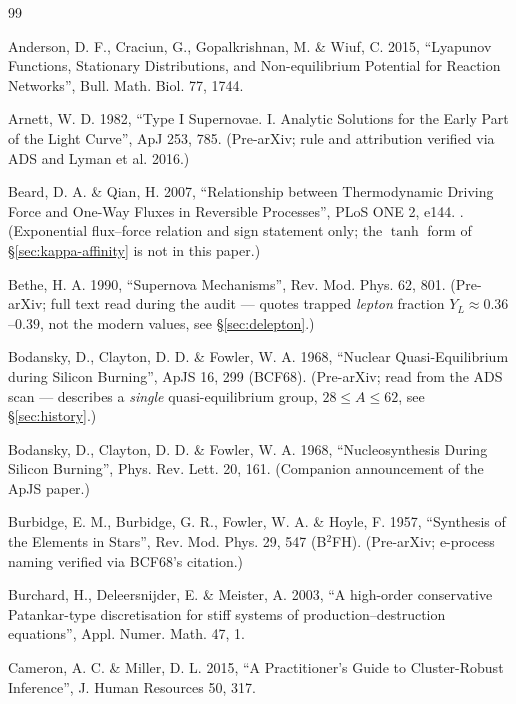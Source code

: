 \begingroup
\raggedright
\begin{thebibliography}{99}

Anderson, D. F., Craciun, G., Gopalkrishnan, M. \& Wiuf, C. 2015,
``Lyapunov Functions, Stationary Distributions, and Non-equilibrium Potential
for Reaction Networks'', Bull. Math. Biol. 77, 1744.

Arnett, W. D. 1982, ``Type I Supernovae. I. Analytic Solutions for the Early
Part of the Light Curve'', ApJ 253, 785. (Pre-arXiv; rule and attribution
verified via ADS and Lyman et al. 2016.)

Beard, D. A. \& Qian, H. 2007, ``Relationship between Thermodynamic Driving
Force and One-Way Fluxes in Reversible Processes'', PLoS ONE 2, e144.
. (Exponential flux--force relation and sign statement
only; the $\tanh$ form of \S\ref{sec:kappa-affinity} is not in this paper.)

Bethe, H. A. 1990, ``Supernova Mechanisms'', Rev. Mod. Phys. 62, 801.
(Pre-arXiv; full text read during the audit --- quotes trapped \emph{lepton}
fraction $Y_L \approx 0.36$--$0.39$, not the modern \Ye{} values, see
\S\ref{sec:delepton}.)

Bodansky, D., Clayton, D. D. \& Fowler, W. A. 1968, ``Nuclear
Quasi-Equilibrium during Silicon Burning'', ApJS 16, 299 (BCF68). (Pre-arXiv;
read from the ADS scan --- describes a \emph{single} quasi-equilibrium group,
$28 \le A \le 62$, see \S\ref{sec:history}.)

Bodansky, D., Clayton, D. D. \& Fowler, W. A. 1968, ``Nucleosynthesis During
Silicon Burning'', Phys. Rev. Lett. 20, 161. (Companion announcement of the
ApJS paper.)

Burbidge, E. M., Burbidge, G. R., Fowler, W. A. \& Hoyle, F. 1957, ``Synthesis
of the Elements in Stars'', Rev. Mod. Phys. 29, 547 (B$^2$FH). (Pre-arXiv;
e-process naming verified via BCF68's citation.)

Burchard, H., Deleersnijder, E. \& Meister, A. 2003, ``A high-order
conservative Patankar-type discretisation for stiff systems of
production--destruction equations'', Appl. Numer. Math. 47, 1.

Cameron, A. C. \& Miller, D. L. 2015, ``A Practitioner's Guide to
Cluster-Robust Inference'', J. Human Resources 50, 317.


\end{thebibliography}
